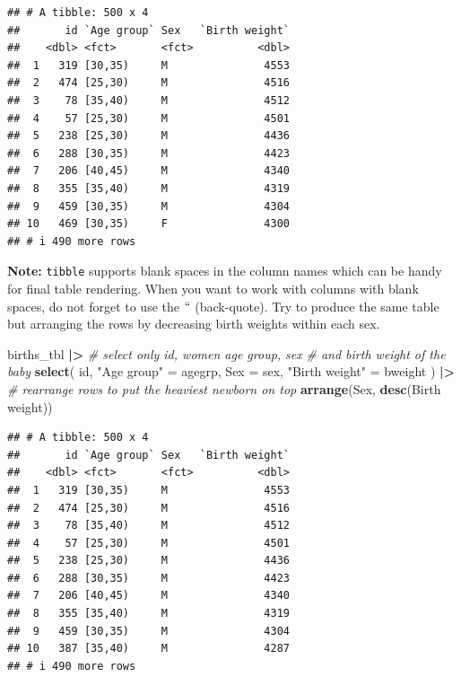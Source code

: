\documentclass[
]{book}
\newenvironment{Shaded}{\begin{snugshade}}{\end{snugshade}}
\newcommand{\AttributeTok}[1]{\textcolor[rgb]{0.13,0.29,0.53}{#1}}
\newcommand{\CommentTok}[1]{\textcolor[rgb]{0.56,0.35,0.01}{\textit{#1}}}
\newcommand{\FunctionTok}[1]{\textcolor[rgb]{0.13,0.29,0.53}{\textbf{#1}}}
\newcommand{\NormalTok}[1]{#1}
\newcommand{\OtherTok}[1]{\textcolor[rgb]{0.56,0.35,0.01}{#1}}
\newcommand{\SpecialCharTok}[1]{\textcolor[rgb]{0.81,0.36,0.00}{\textbf{#1}}}
\newcommand{\StringTok}[1]{\textcolor[rgb]{0.31,0.60,0.02}{#1}}
\theoremstyle{definition}
\theoremstyle{definition}
\theoremstyle{definition}
\theoremstyle{definition}
\theoremstyle{remark}
\begin{document}
\begin{verbatim}
## # A tibble: 500 x 4
##       id `Age group` Sex   `Birth weight`
##    <dbl> <fct>       <fct>          <dbl>
##  1   319 [30,35)     M               4553
##  2   474 [25,30)     M               4516
##  3    78 [35,40)     M               4512
##  4    57 [25,30)     M               4501
##  5   238 [25,30)     M               4436
##  6   288 [30,35)     M               4423
##  7   206 [40,45)     M               4340
##  8   355 [35,40)     M               4319
##  9   459 [30,35)     M               4304
## 10   469 [30,35)     F               4300
## # i 490 more rows
\end{verbatim}

\textbf{Note:} \texttt{tibble} supports blank spaces in the column names which can be handy for final table
rendering. When you want to work with columns with blank spaces, do not forget to use the \(``\)
(back-quote).
Try to produce the same table but arranging the rows by decreasing birth weights within each sex.

\begin{Shaded}
\begin{Highlighting}[]
\NormalTok{births\_tbl }\SpecialCharTok{|\textgreater{}}
  \CommentTok{\# select only id, women age group, sex }
  \CommentTok{\# and birth weight of the baby}
  \FunctionTok{select}\NormalTok{(}
\NormalTok{    id,}
    \StringTok{"Age group"} \OtherTok{=}\NormalTok{ agegrp,}
    \AttributeTok{Sex =}\NormalTok{ sex,}
    \StringTok{"Birth weight"} \OtherTok{=}\NormalTok{ bweight}
\NormalTok{  ) }\SpecialCharTok{|\textgreater{}}
  \CommentTok{\# rearrange rows to put the heaviest newborn on top}
  \FunctionTok{arrange}\NormalTok{(Sex, }\FunctionTok{desc}\NormalTok{(}\StringTok{\textasciigrave{}}\AttributeTok{Birth weight}\StringTok{\textasciigrave{}}\NormalTok{))}
\end{Highlighting}
\end{Shaded}

\begin{verbatim}
## # A tibble: 500 x 4
##       id `Age group` Sex   `Birth weight`
##    <dbl> <fct>       <fct>          <dbl>
##  1   319 [30,35)     M               4553
##  2   474 [25,30)     M               4516
##  3    78 [35,40)     M               4512
##  4    57 [25,30)     M               4501
##  5   238 [25,30)     M               4436
##  6   288 [30,35)     M               4423
##  7   206 [40,45)     M               4340
##  8   355 [35,40)     M               4319
##  9   459 [30,35)     M               4304
## 10   387 [35,40)     M               4287
## # i 490 more rows
\end{verbatim}
\end{document}
